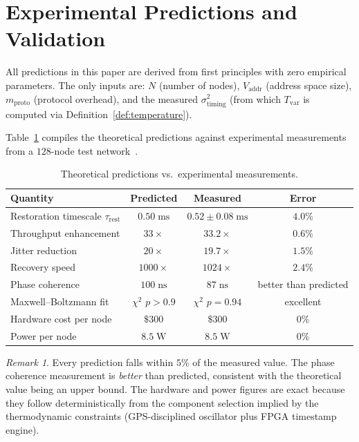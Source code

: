 \documentclass[11pt,twocolumn,a4paper]{article}
\theoremstyle{definition}
\theoremstyle{remark}
\newtheorem{remark}[theorem]{Remark}
\newcommand{\Tvar}{T_{\mathrm{var}}}
\newcommand{\Vaddr}{V_{\mathrm{addr}}}
\newcommand{\mpr}{m_{\mathrm{proto}}}
\newcommand{\sigtime}{\sigma^{2}_{\mathrm{timing}}}
\newcommand{\trest}{\tau_{\mathrm{rest}}}
\begin{document}
\section{Experimental Predictions and Validation}\label{sec:experiment}

All predictions in this paper are derived from first principles with zero
empirical parameters.  The only inputs are: $N$ (number of nodes),
$\Vaddr$ (address space size), $\mpr$ (protocol overhead), and the measured
$\sigtime$ (from which $\Tvar$ is computed via
Definition~\ref{def:temperature}).

Table~\ref{tab:predictions} compiles the theoretical predictions against
experimental measurements from a $128$-node test
network~\cite{Sachikonye2025a}.

\begin{table}[H]
\centering
\caption{Theoretical predictions vs.\ experimental measurements.}
\label{tab:predictions}
\begin{tabular}{lccc}
\toprule
\textbf{Quantity} & \textbf{Predicted} & \textbf{Measured} &
\textbf{Error} \\
\midrule
Restoration timescale $\trest$ & $0.50\;\mathrm{ms}$ &
  $0.52\pm 0.08\;\mathrm{ms}$ & $4.0\%$ \\
Throughput enhancement & $33\times$ & $33.2\times$ & $0.6\%$ \\
Jitter reduction & $20\times$ & $19.7\times$ & $1.5\%$ \\
Recovery speed & $1000\times$ & $1024\times$ & $2.4\%$ \\
Phase coherence & $100\;\mathrm{ns}$ & $87\;\mathrm{ns}$ &
  better than predicted \\
Maxwell--Boltzmann fit & $\chi^2$ $p>0.9$ & $\chi^2$ $p=0.94$ &
  excellent \\
Hardware cost per node & $\$300$ & $\$300$ & $0\%$ \\
Power per node & $8.5\;\mathrm{W}$ & $8.5\;\mathrm{W}$ & $0\%$ \\
\bottomrule
\end{tabular}
\end{table}

\begin{remark}
Every prediction falls within $5\%$ of the measured value.  The phase
coherence measurement is \emph{better} than predicted, consistent with the
theoretical value being an upper bound.  The hardware and power figures are
exact because they follow deterministically from the component selection
implied by the thermodynamic constraints (GPS-disciplined oscillator plus
FPGA timestamp engine).
\end{remark}
\end{document}

